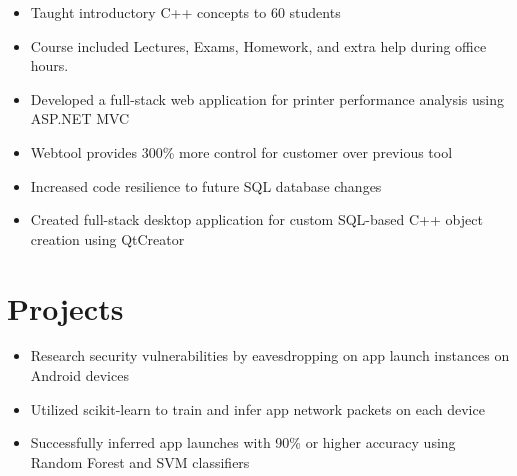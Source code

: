 \documentclass{Custom_CV}
\begin{document}
\begin{itemize}[noitemsep]
    \item Taught introductory C++ concepts to 60 students
    \item Course included Lectures, Exams, Homework, and extra help during office hours.
\end{itemize}


\begin{itemize}[rightmargin=\dimexpr\linewidth-15cm-\leftmargin\relax,noitemsep]
    \item Developed a full-stack web application for printer performance analysis using ASP.NET MVC
    \item Webtool provides 300\% more control for customer over previous tool
    \item Increased code resilience to future SQL database changes
\end{itemize}


\begin{itemize}[rightmargin=\dimexpr\linewidth-15cm-\leftmargin\relax,noitemsep]
\item Created full-stack desktop application for custom SQL-based C++ object creation using QtCreator
\end{itemize}


\section{Projects}
\begin{itemize}[rightmargin=\dimexpr\linewidth-15cm-\leftmargin\relax,noitemsep]
\item Research security vulnerabilities by eavesdropping on app launch instances on Android devices
\item Utilized scikit-learn to train and infer app network packets on each device
\item Successfully inferred app launches with 90\% or higher accuracy using Random Forest and SVM classifiers
\end{itemize}
\end{document}
